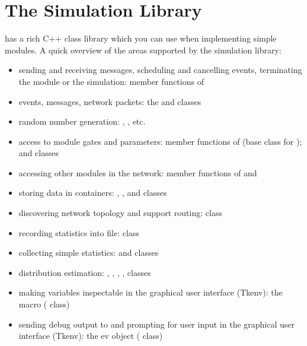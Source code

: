 \chapter{The Simulation Library}
\label{cha:the-simulation-library}

{\opp} has a rich C++ class library which you can use when implementing
simple modules. A quick overview of the areas supported by the
simulation library:
\begin{itemize}
  \item{sending and receiving messages, scheduling and cancelling
    events, terminating the module or the simulation: member functions
    of }
  \item{events, messages, network packets: the
     and  classes}
  \item{random number generation: ,
    , etc.}
  \item{access to module gates and parameters: member functions of
     (base class for
    );  and
     classes}
  \item{accessing other modules in the network: member functions of 
    and }
  \item{storing data in containers: ,
    ,  and
     classes}
  \item{discovering network topology and support routing:  class}
  \item{recording statistics into file:  class}
  \item{collecting simple statistics:  and
     classes}
  \item{distribution estimation: ,
    ,
    , ,
     classes}
  \item{making variables inspectable in the graphical user interface
    (Tkenv): the  macro ( class)}
  \item{sending debug output to and prompting for user input in the graphical
    user interface (Tkenv): the ev object ( class)}
\end{itemize}





